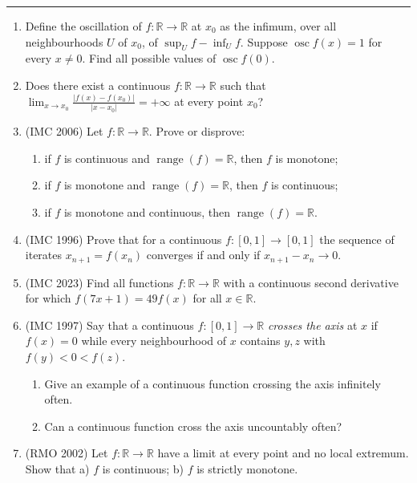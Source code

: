 \documentclass[11pt,a4paper]{article}
\begin{document}
\noindent\rule{\textwidth}{0.4pt}\par\vspace{4pt}
\begin{enumerate}
\item Define the oscillation of $f\colon\mathbb R\to\mathbb R$ at $x_0$ as the infimum, over all
neighbourhoods $U$ of $x_0$, of $\sup_Uf-\inf_Uf$. Suppose $\operatorname{osc}f(x)=1$ for every
$x\ne0$. Find all possible values of $\operatorname{osc}f(0)$.

\item Does there exist a continuous $f\colon\mathbb R\to\mathbb R$ such that
$\lim_{x\to x_0}\frac{|f(x)-f(x_0)|}{|x-x_0|}=+\infty$ at every point $x_0$?

\item (IMC 2006) Let $f\colon\mathbb R\to\mathbb R$. Prove or disprove:
\begin{enumerate}[label=\alph*)]
\item if $f$ is continuous and $\operatorname{range}(f)=\mathbb R$, then $f$ is monotone;
\item if $f$ is monotone and $\operatorname{range}(f)=\mathbb R$, then $f$ is continuous;
\item if $f$ is monotone and continuous, then $\operatorname{range}(f)=\mathbb R$.
\end{enumerate}

\item (IMC 1996) Prove that for a continuous $f\colon[0,1]\to[0,1]$ the sequence of iterates
$x_{n+1}=f(x_n)$ converges if and only if $x_{n+1}-x_n\to0$.

\item (IMC 2023) Find all functions $f\colon\mathbb R\to\mathbb R$ with a continuous second
derivative for which $f(7x+1)=49f(x)$ for all $x\in\mathbb R$.

\item (IMC 1997) Say that a continuous $f\colon[0,1]\to\mathbb R$ \emph{crosses the axis} at $x$ if
$f(x)=0$ while every neighbourhood of $x$ contains $y,z$ with $f(y)<0<f(z)$.
\begin{enumerate}[label=\alph*)]
\item Give an example of a continuous function crossing the axis infinitely often.
\item Can a continuous function cross the axis uncountably often?
\end{enumerate}

\item (RMO 2002) Let $f\colon\mathbb R\to\mathbb R$ have a limit at every point and no local
extremum. Show that a) $f$ is continuous; b) $f$ is strictly monotone.


\end{enumerate}
\end{document}
